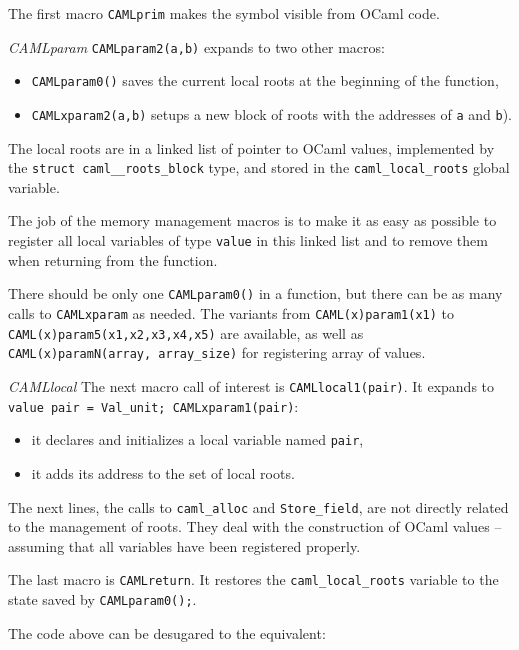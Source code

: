 \documentclass[a4paper]{easychair}
\begin{document}
The first macro \texttt{CAMLprim} makes the symbol visible from OCaml
code.

\emph{CAMLparam} \texttt{CAMLparam2(a,b)} expands to two other macros:

\begin{itemize}
\tightlist
\item
  \texttt{CAMLparam0()} saves the current local roots at the beginning
  of the function,
\item
  \texttt{CAMLxparam2(a,b)} setups a new block of roots with the
  addresses of \texttt{a} and \texttt{b}).
\end{itemize}

The local roots are in a linked list of pointer to OCaml values,
implemented by the \texttt{struct\ caml\_\_roots\_block} type, and
stored in the \texttt{caml\_local\_roots} global variable.

The job of the memory management macros is to make it as easy as
possible to register all local variables of type \texttt{value} in this
linked list and to remove them when returning from the function.

There should be only one \texttt{CAMLparam0()} in a function, but there
can be as many calls to \texttt{CAMLxparam} as needed. The variants from
\texttt{CAML(x)param1(x1)} to \texttt{CAML(x)param5(x1,x2,x3,x4,x5)} are
available, as well as \texttt{CAML(x)paramN(array,\ array\_size)} for
registering array of values.

\emph{CAMLlocal} The next macro call of interest is
\texttt{CAMLlocal1(pair)}. It expands to
\texttt{value\ pair\ =\ Val\_unit;\ CAMLxparam1(pair)}:

\begin{itemize}
\tightlist
\item
  it declares and initializes a local variable named \texttt{pair},
\item
  it adds its address to the set of local roots.
\end{itemize}

The next lines, the calls to \texttt{caml\_alloc} and
\texttt{Store\_field}, are not directly related to the management of
roots. They deal with the construction of OCaml values -- assuming that
all variables have been registered properly.

The last macro is \texttt{CAMLreturn}. It restores the
\texttt{caml\_local\_roots} variable to the state saved by
\texttt{CAMLparam0();}.

The code above can be desugared to the equivalent:
\end{document}
